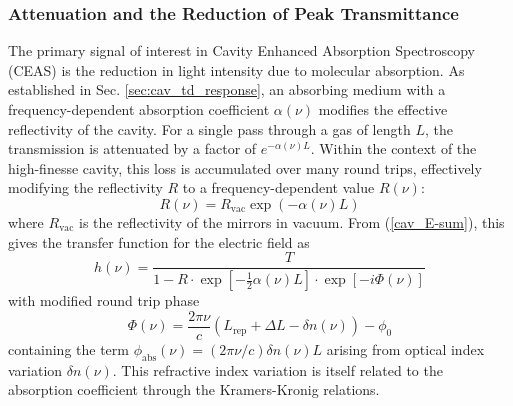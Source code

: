 \documentclass[8pt,a4paper]{report}
\begin{document}
	\subsubsection{Attenuation and the Reduction of Peak Transmittance}
	
	The primary signal of interest in Cavity Enhanced Absorption Spectroscopy (CEAS) is the reduction in light intensity due to molecular absorption. As established in Sec. \ref{sec:cav_td_response}, an absorbing medium with a frequency-dependent absorption coefficient $\alpha(\nu)$ modifies the effective reflectivity of the cavity. For a single pass through a gas of length $L$, the transmission is attenuated by a factor of $e^{-\alpha(\nu) L}$. Within the context of the high-finesse cavity, this loss is accumulated over many round trips, effectively modifying the reflectivity $R$ to a frequency-dependent value $R(\nu)$:
	\begin{equation} \label{eq:eff_reflectivity}
		R(\nu) = R_{\text{vac}} \exp\left( -\alpha(\nu) L \right)
	\end{equation}
	where $R_{\text{vac}}$ is the reflectivity of the mirrors in vacuum. From (\ref{cav_E-sum}), this gives the transfer function for the electric field \cite{vernier_continuous_filtering} as
	\begin{equation}
		h(\nu) = \frac{T}{1 - R \cdot \exp\left[-\frac{1}{2}\alpha(\nu)L\right]\cdot \exp\left[- i \Phi(\nu)\right]}
	\end{equation}
	with modified round trip phase
	\begin{equation}
		\Phi(\nu) = \frac{2\pi \nu}{c} \left( L_\mathrm{rep} + \Delta L - \delta n(\nu) \right) - \phi_0
	\end{equation}
	containing the term $\phi_\mathrm{abs}(\nu) = (2\pi\nu/c)\delta n(\nu) L$ arising from optical index variation $\delta n(\nu)$. This refractive index variation is itself related to the absorption coefficient through the Kramers-Kronig relations.
	
\end{document}
